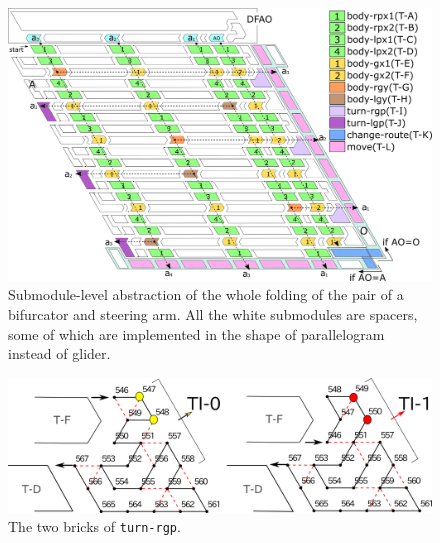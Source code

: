 \documentclass[runningheads]{llncs}
\begin{document}
\begin{figure}[tb]
\centering
\includegraphics[width=\linewidth]{Figs/bitmap.png}
\caption{Submodule-level abstraction of the whole folding of the pair of a bifurcator and steering arm. 
All the white submodules are spacers, some of which are implemented in the shape of parallelogram instead of glider.}
\label{fig:turner}
\end{figure}

\begin{figure}
\vspace*{-7mm}
\centering
\includegraphics[width=\linewidth]{Figs/turn-rgp.png}
\caption{The two bricks of \texttt{turn-rgp}.}
\label{fig:turn-rgp}
\end{figure}
\end{document}
